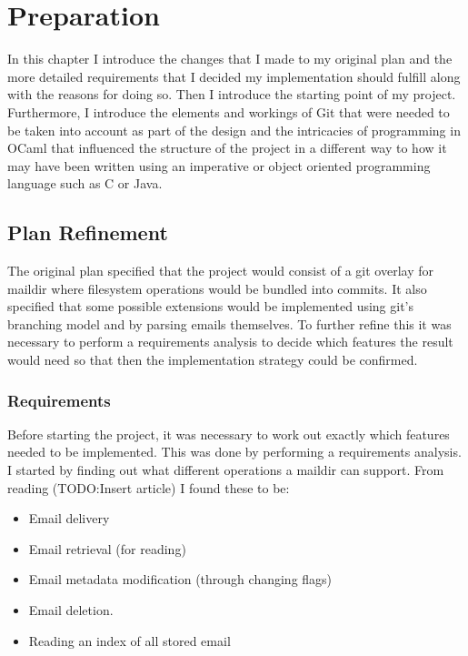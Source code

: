 \chapter{Preparation}

In this chapter I introduce the changes that I made to my original plan and the more detailed requirements that I decided my implementation should fulfill along with the reasons for doing so. Then I introduce the starting point of my project. Furthermore, I introduce the elements and workings of Git that were needed to be taken into account as part of the design and the intricacies of programming in OCaml that influenced the structure of the project in a different way to how it may have been written using an imperative or object oriented programming language such as C or Java.

\section{Plan Refinement}

The original plan specified that the project would consist of a git overlay for maildir where filesystem operations would be bundled into commits. It also specified that some possible extensions would be implemented using git's branching model and by parsing emails themselves. To further refine this it was necessary to perform a requirements analysis to decide which features the result would need so that then the implementation strategy could be confirmed.

\subsection{Requirements}

Before starting the project, it was necessary to work out exactly which features needed to be implemented. This was done by performing a requirements analysis. I started by finding out what different operations a maildir can support. From reading (TODO:Insert article)\cite{TODO} I found these to be:

\begin{itemize}
  \item Email delivery
  \item Email retrieval (for reading)
  \item Email metadata modification (through changing flags)
  \item Email deletion.
  \item Reading an index of all stored email
\end{itemize}


